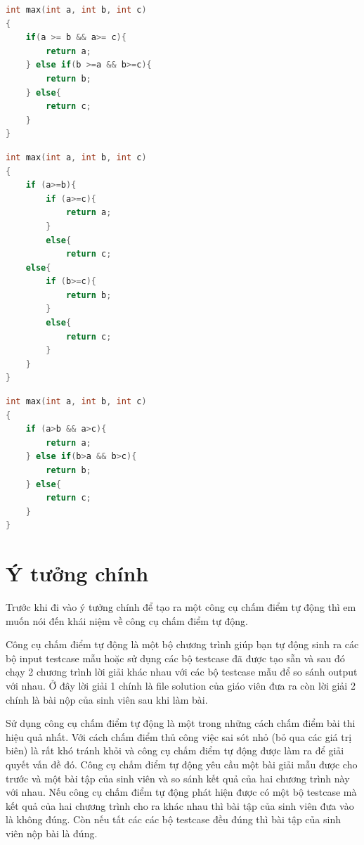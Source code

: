 \documentclass[12pt,a4paper]{report}
\begin{document}
\begin{multicols}{2}
\begin{lstlisting}[language=c]
int max(int a, int b, int c) 
{
    if(a >= b && a>= c){
        return a;
    } else if(b >=a && b>=c){
        return b;
    } else{
        return c;
    }
}
\end{lstlisting}
\caption{Hình a. Solution}
\newline \newline \newline \newline \newline \newline
\begin{lstlisting}[language=c]
int max(int a, int b, int c) 
{ 
    if (a>=b){
        if (a>=c){
            return a;
        }
        else{
            return c;
    else{
        if (b>=c){
            return b;
        }
        else{
            return c; 
        }
    }
}
\end{lstlisting}
\caption{Hình b. Sinh viên 1}
\end{multicols}

\begin{lstlisting}[language=c]
int max(int a, int b, int c) 
{ 
    if (a>b && a>c){
        return a;
    } else if(b>a && b>c){
        return b;
    } else{
        return c;
    }
}

\end{lstlisting}
\caption{Hình c. Sinh viên 2}

\section{Ý tưởng chính}
Trước khi đi vào ý tưởng chính để tạo ra một công cụ chấm điểm tự động thì em muốn nói đến khái niệm về công cụ chấm điểm tự động.

Công cụ chấm điểm tự động là một bộ chương trình giúp bạn tự động sinh ra các bộ input testcase mẫu hoặc sử dụng các bộ testcase đã được tạo sẵn và sau đó chạy 2 chương trình lời giải khác nhau với các bộ testcase mẫu để so sánh output với nhau. Ở đây lời giải 1 chính là file solution của giáo viên đưa ra còn lời giải 2 chính là bài nộp của sinh viên sau khi làm bài.

Sử dụng công cụ chấm điểm tự động là một trong những cách chấm điểm bài thi hiệu quả nhất. Với cách chấm điểm thủ công việc sai sót nhỏ (bỏ qua các giá trị biên) là rất khó tránh khỏi và công cụ chấm điểm tự động được làm ra để giải quyết vấn đề đó. Công cụ chấm điểm tự động yêu cầu một bài giải mẫu được cho trước và một bài tập của sinh viên và so sánh kết quả của hai chương trình này với nhau. Nếu công cụ chấm điểm tự động phát hiện được có một bộ testcase mà kết quả của hai chương trình cho ra khác nhau thì bài tập của sinh viên đưa vào là không đúng. Còn nếu tất các các bộ testcase đều đúng thì bài tập của sinh viên nộp bài là đúng.
\end{document}
